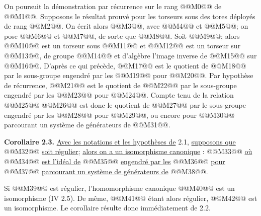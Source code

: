 
On
poursuit la démonstration par récurrence sur le rang @@M0@@ de @@M1@@. Supposons le résultat prouvé pour les torseurs sous des tores déployés de rang @@M2@@. On écrit alors @@M3@@, avec @@M4@@ et @@M5@@; on pose @@M6@@ et @@M7@@, de sorte que @@M8@@. Soit @@M9@@; alors @@M10@@ est un torseur sous @@M11@@ et @@M12@@ est un torseur sur @@M13@@, de groupe @@M14@@ et d'algèbre l'image inverse de @@M15@@ sur @@M16@@. D'après ce qui précède, @@M17@@ est le quotient de @@M18@@ par le sous-groupe engendré par les @@M19@@ pour @@M20@@. Par hypothèse de récurrence, @@M21@@ est le quotient de @@M22@@ par le sous-groupe engendré par les @@M23@@ pour @@M24@@. Compte tenu de la relation
@@M25@@
@@M26@@ est donc le quotient de @@M27@@ par le sous-groupe engendré par les @@M28@@ pour @@M29@@, ou encore pour @@M30@@ parcourant un système de générateurs de @@M31@@.

\textbf{Corollaire 2.3.} \uline{Avec les notations et les hypothèses de} 2.1, \uline{supposons que} @@M32@@ \uline{soit régulier}; \uline{alors on a un isomorphisme canonique} :
@@M33@@
\uline{où} @@M34@@ \uline{est l'idéal de} @@M35@@ \uline{engendré par les} @@M36@@ \uline{pour} @@M37@@ \uline{parcourant un système de générateurs de} @@M38@@.

Si @@M39@@ est régulier, l'homomorphisme canonique @@M40@@ est un isomorphisme (IV 2.5). De même, @@M41@@ étant alors régulier, @@M42@@ est un isomorphisme. Le corollaire résulte donc immédiatement de 2.2.

